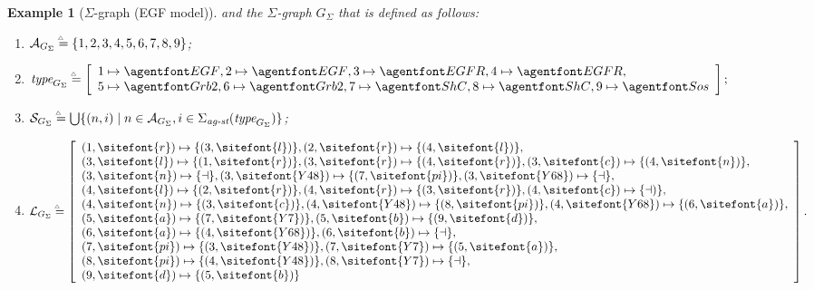 \documentclass{entcs}
\newcommand{\map}[2]{#2}
\newcommand{\freesymbol}{\dashv}
\newcommand{\graphsymb}{G}
\newcommand{\linksite}{\signaturesymb_{\textit{ag-st}}}
\newcommand{\signaturesymb}{\Sigma}
\newcommand{\bydef}{\stackrel{\scalebox{0.8}{\!\!$\scriptscriptstyle{\triangle}$}}{=}}
\newcommand{\agents}[1][\graphsymb]{\mathcal{A}_{#1}}
\newcommand{\type}[1][\graphsymb]{\textit{type}_{#1}}
\newcommand{\sites}[1][\graphsymb]{\mathcal{S}_{#1}}
\newcommand{\links}[1][\graphsymb]{\mathcal{L}_{#1}}
\newcommand{\graphtuple}[1][]{(\agents[#1],\type[#1],\sites[#1],\links[#1])}
\newtheorem{myexample}[thm]{Example}
\begin{document}
\begin{myexample}[$\Sigma$-graph (EGF model)]
and the $\Sigma$-graph $\graphsymb_{\Sigma}%
$ that is defined as follows:
\begin{enumerate}
  \item $\agents[\graphsymb_{\Sigma}]\bydef\{1,2,3,4,5,6,7,8,9\}$;
  \item $\type[\graphsymb_{\Sigma}]\bydef \map{\begin{cases}\begin{array}{ccc}%
  1 &\mapsto&\agent{EGF}{}\cr%
  2 &\mapsto&\agent{EGF}{}\cr%
  3 &\mapsto&\agent{EGFR}{}\cr%
  4 &\mapsto&\agent{EGFR}{}\cr%
  5 &\mapsto&\agent{Grb2}{}\cr%
  6 &\mapsto&\agent{Grb2}{}\cr%
  7 &\mapsto&\agent{ShC}{}\cr%
  8 &\mapsto&\agent{ShC}{}\cr%
  9 &\mapsto&\agent{Sos}{}.
\end{array}\end{cases}}{\left[\begin{array}{l}1 \mapsto \agent{EGF}{}, 2 \mapsto \agent{EGF}{}, 3 \mapsto \agent{EGFR}{}, 4 \mapsto \agent{EGFR}{}, \cr 5 \mapsto \agent{Grb2}{}, 6 \mapsto \agent{Grb2}{}, 7 \mapsto \agent{ShC}{}, 8 \mapsto \agent{ShC}{},
9 \mapsto \agent{Sos}{}\end{array}\right];}$
  \item $\sites[\graphsymb_\Sigma]\bydef
\bigcup \{(n,i)\;|\; n\in \agents[\graphsymb_\Sigma],
i\in\linksite(\type[\graphsymb_{\Sigma}])\}$;
  \item $\links[\graphsymb_{\Sigma}]\bydef\map{}{\left[%
  \begin{array}{l}
    (1,\sitefont{r})\mapsto\{(3,\sitefont{l})\},
    (2,\sitefont{r})\mapsto\{(4,\sitefont{l})\},\cr
    (3,\sitefont{l})\mapsto \{(1,\sitefont{r})\},
    (3,\sitefont{r})\mapsto \{(4,\sitefont{r})\},
    (3,\sitefont{c})\mapsto \{(4,\sitefont{n})\},\cr
    (3,\sitefont{n})\mapsto \{\freesymbol\},
    (3,\sitefont{Y48})\mapsto \{(7,\sitefont{pi})\},
    (3,\sitefont{Y68})\mapsto \{\freesymbol\},\cr
    (4,\sitefont{l})\mapsto \{(2,\sitefont{r})\},
    (4,\sitefont{r})\mapsto \{(3,\sitefont{r})\},
    (4,\sitefont{c})\mapsto \{\freesymbol)\},\cr
    (4,\sitefont{n})\mapsto \{(3,\sitefont{c})\},
    (4,\sitefont{Y48})\mapsto \{(8,\sitefont{pi})\},
    (4,\sitefont{Y68})\mapsto \{(6,\sitefont{a})\},\cr
    (5,\sitefont{a})\mapsto \{(7,\sitefont{Y7})\},
    (5,\sitefont{b})\mapsto \{(9,\sitefont{d})\},\cr
    (6,\sitefont{a})\mapsto \{(4,\sitefont{Y68})\},
    (6,\sitefont{b})\mapsto \{\freesymbol\},\cr
    (7,\sitefont{pi})\mapsto \{(3,\sitefont{Y48})\},
    (7,\sitefont{Y7})\mapsto \{(5,\sitefont{a})\},\cr
    (8,\sitefont{pi})\mapsto \{(4,\sitefont{Y48})\},
    (8,\sitefont{Y7})\mapsto \{\freesymbol\},\cr
(9,\sitefont{d}) \mapsto \{(5,\sitefont{b})\}
  \end{array}\right]}.$
\end{enumerate}
\end{myexample}
\end{document}
